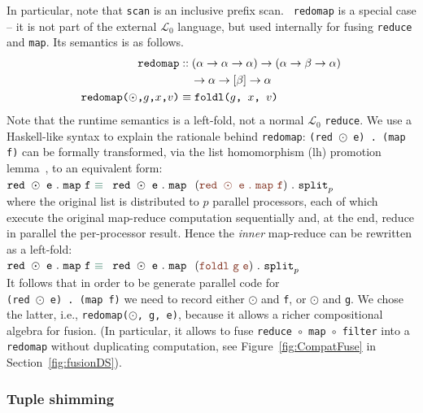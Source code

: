 \documentclass{sigplanconf}  %
\newcommand{\emp}[1]{\textcolor{DikuRed}{ #1}}
\newcommand{\emphh}[1]{\textcolor{CosGreen}{ #1}}
\newcommand{\LO}{$\mathcal{L}_0$}
\begin{document}
In particular, note that {\tt scan} is an inclusive prefix scan.  {\tt
  redomap} is a special case -- it is not part of the external \LO{}
language, but used internally for fusing {\tt reduce} and {\tt map}.
Its semantics is as follows.
\begin{align*}
\text{\tt redomap}
& :: (\alpha\rightarrow\alpha\rightarrow\alpha)\rightarrow(\alpha\rightarrow\beta\rightarrow\alpha)\\
& \quad\rightarrow\alpha\rightarrow[\beta]\rightarrow\alpha \\
\text{\tt redomap($\odot$,$g$,$x$,$v$)} & \equiv \text{\tt foldl($g$, $x$, $v$)}
\end{align*}
Note that the runtime semantics is a left-fold, not a normal \LO{}
\texttt{reduce}.  We use a Haskell-like syntax to explain the rationale 
behind {\tt redomap}:
%
{\tt (red $\odot$ e) . (map f)} can be formally transformed, via the
list homomorphism ({\sc lh}) promotion lemma~\cite{BirdListTh}, to an
equivalent form:  \\
${\tt red}\mbox{ }\odot\mbox{ }{\tt e}\mbox{ }.\mbox{ }{\tt map}\mbox{
}{\tt f}\mbox{ }\emphh{\equiv}$ $\mbox{ }{\tt red}\mbox{ }\odot\mbox{
}{\tt e}\mbox{ }.\mbox{ }{\tt map}\mbox{ }$ $(\emp{{\tt red} \mbox{
  }\odot\mbox{ }{\tt e}\mbox{ }.\mbox{ }{\tt map}\mbox{ }{\tt f}})\ .\mbox{ }{\tt split}_{p}$\\
where the original list is distributed to $p$ parallel processors,
each of which execute the original map-reduce computation sequentially
and, at the end, reduce in parallel the per-processor result.  Hence
the {\em inner} map-reduce can be
rewritten as a left-fold:\\
${\tt red}\mbox{ }\odot\mbox{ }{\tt e}\mbox{ }.\mbox{ }{\tt map}\mbox{
}{\tt f}\mbox{ }\emphh{\equiv}$ $\mbox{ }{\tt red}\mbox{ }\odot\mbox{
}{\tt e}\mbox{ }.\mbox{ }{\tt map} \mbox{ }$ $(\emp{{\tt foldl}\mbox{
  }{\tt g}\mbox{ }{\tt e}})\ .\ {\tt split}_{p}$\\
It follows that in order to be generate parallel code for \\ 
{\tt (red $\odot$ e) . (map f)} we need to record either $\odot$ and {\tt f},
or $\odot$ and {\tt g}. We chose the latter, i.e., {\tt redomap($\odot$, g, e)}, 
because it allows a richer compositional algebra for fusion.
(In particular, it  allows to fuse {\tt reduce $\circ$ map $\circ$ filter}
into a {\tt redomap} without duplicating computation, see 
Figure~\ref{fig:CompatFuse} in Section~\ref{fig:fusionDS}).

\subsubsection{Tuple shimming}
\label{sec:shimming}
\end{document}
